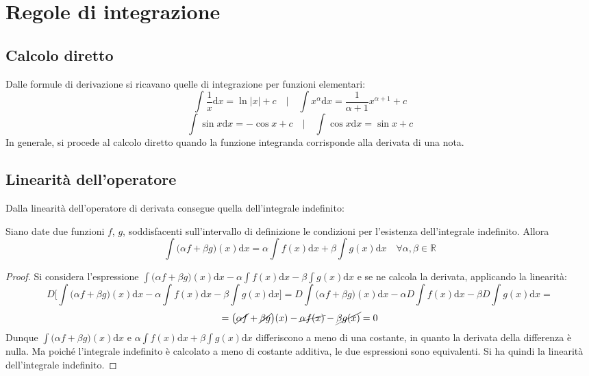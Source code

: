 \documentclass[10pt, oneside]{book}
\theoremstyle{plain}
\begin{document}
\section{Regole di integrazione}
\subsection{Calcolo diretto}
Dalle formule di derivazione si ricavano quelle di integrazione per funzioni elementari:
\[\int \frac{1}{x}\textrm{d}x = \ln|x| + c \quad \bigg| \quad \int x^\alpha\textrm{d}x = \frac{1}{\alpha + 1} x^{\alpha + 1} + c\]
\[\int \sin{x}\textrm{d}x = - \cos{x} + c \quad \bigg| \quad \int \cos{x}\textrm{d}x = \sin{x} + c\]
In generale, si procede al calcolo diretto quando la funzione integranda corrisponde alla derivata di una nota.
\subsection{Linearità dell'operatore}
Dalla linearità dell'operatore di derivata consegue quella dell'integrale indefinito:
\begin{prop}
    Siano date due funzioni $f$, $g$, soddisfacenti sull'intervallo di definizione le condizioni per l'esistenza dell'integrale indefinito. Allora
    \[\int\big(\alpha f + \beta g\big)(x)\textrm{d}x = \alpha \int f(x)\textrm{d}x + \beta \int g(x) \textrm{d}x\quad \forall \alpha, \beta \in \mathbb{R}\]
\end{prop}
\begin{proof}
    Si considera l'espressione $\int\big(\alpha f + \beta g\big)(x)\textrm{d}x - \alpha \int f(x)\textrm{d}x - \beta \int g(x) \textrm{d}x$ e se ne calcola la derivata, applicando la linearità:
    \[D\bigg[\int\big(\alpha f + \beta g\big)(x)\textrm{d}x - \alpha \int f(x)\textrm{d}x - \beta \int g(x) \textrm{d}x\bigg] = D\int\big(\alpha f + \beta g\big)(x)\textrm{d}x - \alpha D\int f(x)\textrm{d}x - \beta D\int g(x) \textrm{d}x =\]
    \[= \big(\cancel{\alpha f} + \cancel{\beta g}\big)(x) - \cancel{\alpha f(x)} - \cancel{\beta g(x)} = 0\]
    Dunque $\int\big(\alpha f + \beta g\big)(x)\textrm{d}x$ e $\alpha \int f(x)\textrm{d}x + \beta \int g(x) \textrm{d}x$ differiscono a meno di una costante, in quanto la derivata della differenza è nulla. Ma poiché l'integrale indefinito è calcolato a meno di costante additiva, le due espressioni sono equivalenti. Si ha quindi la linearità dell'integrale indefinito.
\end{proof}
\end{document}
